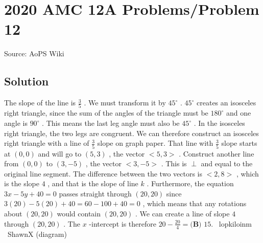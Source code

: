 \documentclass[12pt]{article}
\begin{document}
\section*{{2020 AMC 12A Problems/Problem 12}}
Source: AoPS Wiki

\subsection*{Solution}
The slope of the line is $\frac{3}{5}$ . We must transform it by $45^{\circ}$ . $45^{\circ}$ creates an isosceles right triangle, since the sum of the angles of the triangle must be $180^{\circ}$ and one angle is $90^{\circ}$ . This means the last leg angle must also be $45^{\circ}$ . In the isosceles right triangle, the two legs are congruent. We can therefore construct an isosceles right triangle with a line of $\frac{3}{5}$ slope on graph paper. That line with $\frac{3}{5}$ slope starts at $(0,0)$ and will go to $(5,3)$ , the vector $<5, 3 >$ . Construct another line from $(0,0)$ to $(3,-5)$ , the vector $<3,-5>$ . This is $\perp$ and equal to the original line segment. The difference between the two vectors is $<2,8>$ , which is the slope $4$ , and that is the slope of line $k$ . Furthermore, the equation $3x-5y+40=0$ passes straight through $(20,20)$ since $3(20)-5(20)+40=60-100+40=0$ , which means that any rotations about $(20,20)$ would contain $(20,20)$ . We can create a line of slope $4$ through $(20,20)$ . The $x$ -intercept is therefore $20-\frac{20}{4} = \boxed{\textbf{(B) } 15.}$ ~lopkiloinm ~ShawnX (diagram)
\end{document}
